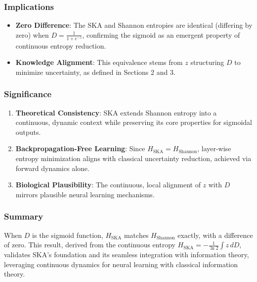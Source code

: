 \documentclass{article}
\begin{document}
\subsubsection{Implications}

\begin{itemize}
	\item \textbf{Zero Difference}: The SKA and Shannon entropies are identical (differing by zero) when \( D = \frac{1}{1 + e^{-z}} \), confirming the sigmoid as an emergent property of continuous entropy reduction.
	\item \textbf{Knowledge Alignment}: This equivalence stems from \( z \) structuring \( D \) to minimize uncertainty, as defined in Sections 2 and 3.
\end{itemize}

\subsubsection{Significance}

\begin{enumerate}
	\item \textbf{Theoretical Consistency}: SKA extends Shannon entropy into a continuous, dynamic context while preserving its core properties for sigmoidal outputs.
	\item \textbf{Backpropagation-Free Learning}: Since \( H_{\text{SKA}} = H_{\text{Shannon}} \), layer-wise entropy minimization aligns with classical uncertainty reduction, achieved via forward dynamics alone.
	\item \textbf{Biological Plausibility}: The continuous, local alignment of \( z \) with \( D \) mirrors plausible neural learning mechanisms.
\end{enumerate}

\subsubsection{Summary}
When \( D \) is the sigmoid function, \( H_{\text{SKA}} \) matches \( H_{\text{Shannon}} \) exactly, with a difference of zero. This result, derived from the continuous entropy \( H_{\text{SKA}} = -\frac{1}{\ln 2} \int z \, dD \), validates SKA’s foundation and its seamless integration with information theory, leveraging continuous dynamics for neural learning with classical information theory.
	
	
\end{document}
